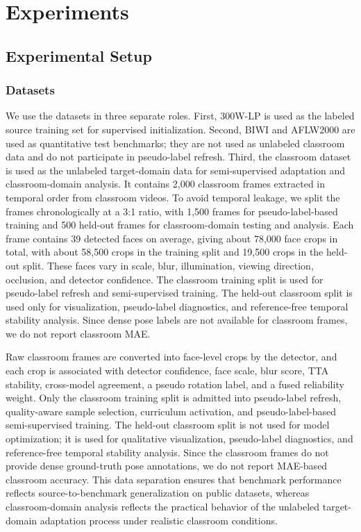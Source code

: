 \documentclass[preprint,12pt]{elsarticle}
\begin{document}
\FloatBarrier

\section{Experiments}
\subsection{Experimental Setup}
\subsubsection{Datasets}

We use the datasets in three separate roles. First, 300W-LP is used as the labeled source training set for supervised initialization. Second, BIWI and AFLW2000 are used as quantitative test benchmarks; they are not used as unlabeled classroom data and do not participate in pseudo-label refresh. Third, the classroom dataset is used as the unlabeled target-domain data for semi-supervised adaptation and classroom-domain analysis. It contains 2,000 classroom frames extracted in temporal order from classroom videos. To avoid temporal leakage, we split the frames chronologically at a 3:1 ratio, with 1,500 frames for pseudo-label-based training and 500 held-out frames for classroom-domain testing and analysis. Each frame contains 39 detected faces on average, giving about 78,000 face crops in total, with about 58,500 crops in the training split and 19,500 crops in the held-out split. These faces vary in scale, blur, illumination, viewing direction, occlusion, and detector confidence. The classroom training split is used for pseudo-label refresh and semi-supervised training. The held-out classroom split is used only for visualization, pseudo-label diagnostics, and reference-free temporal stability analysis. Since dense pose labels are not available for classroom frames, we do not report classroom MAE.

Raw classroom frames are converted into face-level crops by the detector, and each crop is associated with detector confidence, face scale, blur score, TTA stability, cross-model agreement, a pseudo rotation label, and a fused reliability weight. Only the classroom training split is admitted into pseudo-label refresh, quality-aware sample selection, curriculum activation, and pseudo-label-based semi-supervised training. The held-out classroom split is not used for model optimization; it is used for qualitative visualization, pseudo-label diagnostics, and reference-free temporal stability analysis. Since the classroom frames do not provide dense ground-truth pose annotations, we do not report MAE-based classroom accuracy. This data separation ensures that benchmark performance reflects source-to-benchmark generalization on public datasets, whereas classroom-domain analysis reflects the practical behavior of the unlabeled target-domain adaptation process under realistic classroom conditions.
\end{document}
